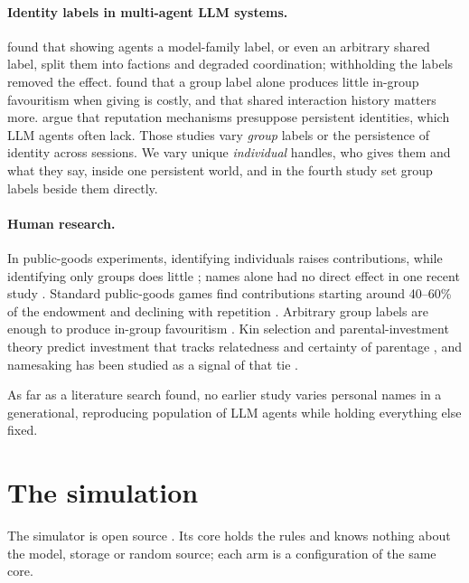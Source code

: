 \documentclass[11pt]{article}
\begin{document}
\paragraph{Identity labels in multi-agent LLM systems.}
\citet{delgiudice2026identity} found that showing agents a model-family label, or even an
arbitrary shared label, split them into factions and degraded coordination; withholding the
labels removed the effect. \citet{chen2026favor} found that a group label alone produces little
in-group favouritism when giving is costly, and that shared interaction history matters more.
\citet{hu2026dissociative} argue that reputation mechanisms presuppose persistent identities,
which LLM agents often lack. Those studies vary \emph{group} labels or the persistence of
identity across sessions. We vary unique \emph{individual} handles, who gives them and what they
say, inside one persistent world, and in the fourth study set group labels beside them directly.

\paragraph{Human research.}
In public-goods experiments, identifying individuals raises contributions, while identifying only
groups does little \citep{andreoni2004public,christens2019identification}; names alone had no
direct effect in one recent study \citep{sampaio2023identity}. Standard public-goods games find
contributions starting around 40--60\% of the endowment and declining with repetition
\citep{ledyard1995public,chaudhuri2011sustaining,fehr2000cooperation}. Arbitrary group labels are
enough to produce in-group favouritism \citep{tajfel1971social}. Kin selection and
parental-investment theory predict investment that tracks relatedness and certainty of parentage
\citep{hamilton1964genetical,trivers1972parental}, and namesaking has been studied as a signal of
that tie \citep{obasi2016naming,saffa2021namesake}.

As far as a literature search found, no earlier study varies personal names in a generational,
reproducing population of LLM agents while holding everything else fixed.

\section{The simulation}
\label{sec:sim}

The simulator is open source \citep{repo2026agentnames}. Its core holds the rules and knows
nothing about the model, storage or random source; each arm is a configuration of the same core.
\end{document}
